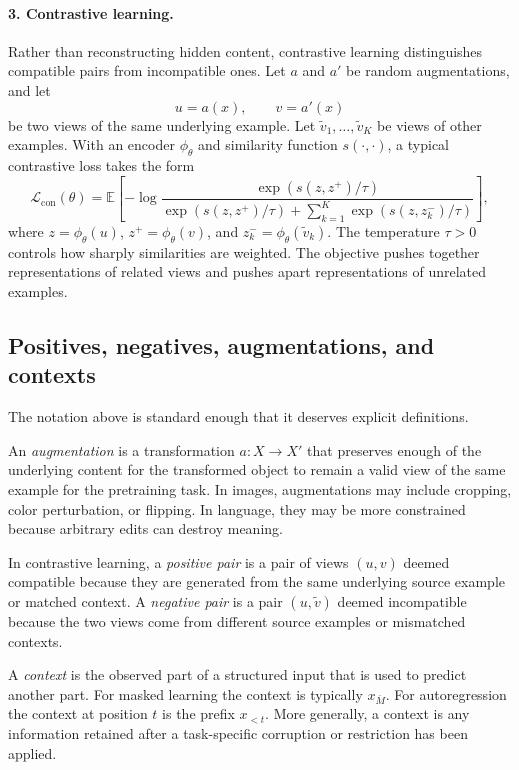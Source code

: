 \paragraph{3. Contrastive learning.}
Rather than reconstructing hidden content, contrastive learning distinguishes compatible pairs from incompatible ones.
Let $a$ and $a'$ be random augmentations, and let
\[
u = a(x), \qquad v = a'(x)
\]
be two views of the same underlying example.
Let $\tilde v_1,\dots,\tilde v_K$ be views of other examples.
With an encoder $\phi_\theta$ and similarity function $s(\cdot,\cdot)$, a typical contrastive loss takes the form
\[
\mathcal{L}_{\mathrm{con}}(\theta)
=
\mathbb{E}
\left[
-\log
\frac{\exp(s(z,z^+)/\tau)}
{\exp(s(z,z^+)/\tau)+\sum_{k=1}^{K} \exp(s(z,z_k^-)/\tau)}
\right],
\]
where $z=\phi_\theta(u)$, $z^+=\phi_\theta(v)$, and $z_k^- = \phi_\theta(\tilde v_k)$.
The temperature $\tau>0$ controls how sharply similarities are weighted.
The objective pushes together representations of related views and pushes apart representations of unrelated examples.

\subsection*{Positives, negatives, augmentations, and contexts}

The notation above is standard enough that it deserves explicit definitions.

\begin{definition}[Augmentation]
An \emph{augmentation} is a transformation $a : X \to X'$ that preserves enough of the underlying content for the transformed object to remain a valid view of the same example for the pretraining task.
In images, augmentations may include cropping, color perturbation, or flipping.
In language, they may be more constrained because arbitrary edits can destroy meaning.
\end{definition}

\begin{definition}
In contrastive learning, a \emph{positive pair} is a pair of views $(u,v)$ deemed compatible because they are generated from the same underlying source example or matched context.
A \emph{negative pair} is a pair $(u,\tilde v)$ deemed incompatible because the two views come from different source examples or mismatched contexts.
\end{definition}

\begin{definition}[Context]
A \emph{context} is the observed part of a structured input that is used to predict another part.
For masked learning the context is typically $x_{\bar M}$.
For autoregression the context at position $t$ is the prefix $x_{<t}$.
More generally, a context is any information retained after a task-specific corruption or restriction has been applied.
\end{definition}

